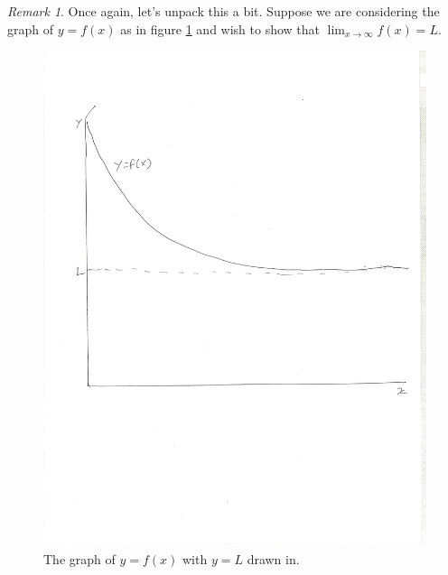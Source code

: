 \documentclass[english]{book}
\theoremstyle{remark}
\newtheorem{remark}{Remark}[theorem]
\theoremstyle{definition}
\newtheorem*{next week}{Next Week}
\newcommand{\dlim}{\displaystyle\lim}
\begin{document}
\begin{remark}
	Once again, let's unpack this a bit. Suppose we are considering the graph of $y=f(x)$ as in figure \ref{fig:1graph4} and wish to show that $\dlim_{x\to \infty} f(x)=L$. 
	\begin{figure}[h!]\centering
		\includegraphics[scale=0.45,trim={0 3.3in 12mm 36mm},clip]{1graph4} \caption{The graph of $y=f(x)$ with $y=L$ drawn in.\label{fig:1graph4}}
	\end{figure}


\end{remark}
\end{document}
